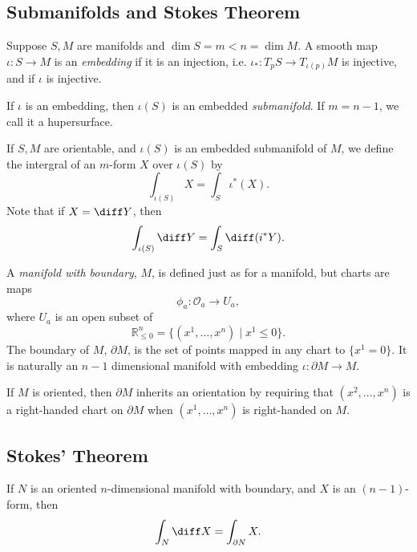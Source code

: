 \documentclass[12pt]{article}
\begin{document}
\subsection{Submanifolds and Stokes Theorem}%
\label{sub:subs}

\begin{definition}
	Suppose $S, M$ are manifolds and $\dim S = m < n = \dim M$. A smooth map $\iota : S \to M$ is an \emph{embedding} if it is an injection, i.e. $\iota_\ast : T_p S \to T_{\iota(p)}M$ is injective, and if $\iota$ is injective.

	If $\iota$ is an embedding, then $\iota(S)$ is an embedded \emph{submanifold}. If $m = n - 1$, we call it a hupersurface.

	If $S, M$ are orientable, and $\iota(S)$ is an embedded submanifold of $M$, we define the intergral of an $m$-form $X$ over $\iota(S)$ by
	\[
	\int_{\iota(S)} X = \int_S \iota^{\ast}(X).
	\]
	Note that if $X = \diff Y$, then
	\[
	\int_{\iota(S)} \diff Y = \int_S \diff (i^{\ast} Y).
	\]
\end{definition}


\begin{definition}
	A \emph{manifold with boundary}, $M$, is defined just as for a manifold, but charts are maps
	\[
	\phi_a : \mathcal{O}_a \to U_a,
	\]
	where $U_a$ is an open subset of
	\[
		\mathbb{R}^n_{\leq 0} = \{(x^1, \ldots, x^n) \mid x^1 \leq 0\}.
	\]
	The boundary of $M$, $\partial M$, is the set of points mapped in any chart to $\{x^1 = 0\}$. It is naturally an $n-1$ dimensional manifold with embedding $\iota : \partial M \to M$.

	If $M$ is oriented, then $\partial M$ inherits an orientation by requiring that $(x^2, \ldots, x^n)$ is a right-handed chart on $\partial M$ when $(x^1, \ldots, x^n)$ is right-handed on $M$.
\end{definition}

\subsection{Stokes' Theorem}%
\label{sub:stm}

\begin{theorem}
	If $N$ is an oriented $n$-dimensional manifold with boundary, and $X$ is an $(n-1)$-form, then
	\[
	\int_N \diff X = \int_{\partial N} X.
	\]
\end{theorem}
\end{document}
